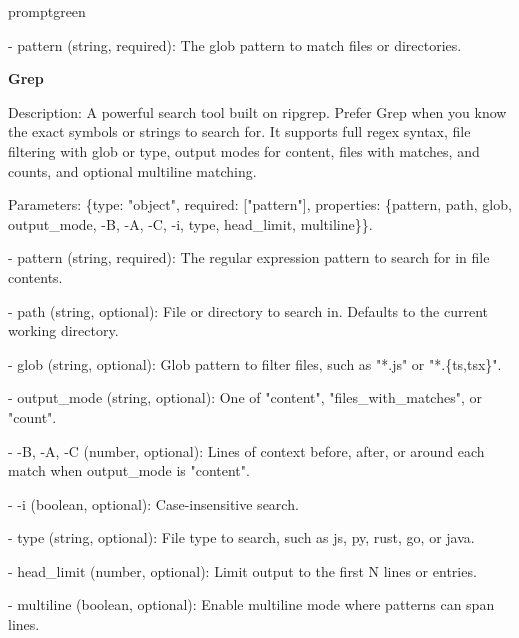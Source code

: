 \begin{promptbox}{promptgreen}
{- pattern (string, required): The glob pattern to match files or directories.\par
\vspace{0.35em}\par
\textbf{Grep}\par
Description: A powerful search tool built on ripgrep. Prefer Grep when you know the exact symbols or strings to search for. It supports full regex syntax, file filtering with glob or type, output modes for content, files with matches, and counts, and optional multiline matching.\par
Parameters: \{type: "object", required: ["pattern"], properties: \{pattern, path, glob, output\_mode, -B, -A, -C, -i, type, head\_limit, multiline\}\}.\par
- pattern (string, required): The regular expression pattern to search for in file contents.\par
- path (string, optional): File or directory to search in. Defaults to the current working directory.\par
- glob (string, optional): Glob pattern to filter files, such as "*.js" or "*.\{ts,tsx\}".\par
- output\_mode (string, optional): One of "content", "files\_with\_matches", or "count".\par
- -B, -A, -C (number, optional): Lines of context before, after, or around each match when output\_mode is "content".\par
- -i (boolean, optional): Case-insensitive search.\par
- type (string, optional): File type to search, such as js, py, rust, go, or java.\par
- head\_limit (number, optional): Limit output to the first N lines or entries.\par
- multiline (boolean, optional): Enable multiline mode where patterns can span lines.\par
}
\end{promptbox}

